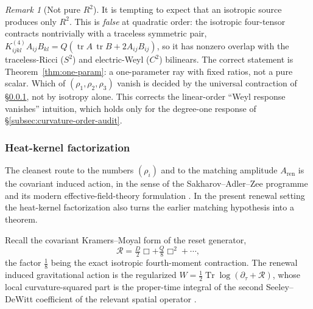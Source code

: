 \documentclass[11pt]{article}
\theoremstyle{definition}
\theoremstyle{remark}
\newtheorem{remark}[theorem]{Remark}
\newcommand{\Tr}{\operatorname{Tr}}
\newcommand{\tr}{\operatorname{tr}}
\newcommand{\ren}{\mathrm{ren}}
\newcommand{\Aren}{A_{\ren}}
\newcommand{\Weyl}{C}
\newcommand{\St}{S}
\begin{document}
\begin{remark}[Not pure $R^2$]
\label{rem:not-pure-r2}
It is tempting to expect that an isotropic source produces only $R^2$.  This is
\emph{false} at quadratic order: the isotropic four-tensor contracts nontrivially
with a traceless symmetric pair, $K^{(4)}_{ijkl}A_{ij}B_{kl}
=Q(\tr A\,\tr B+2A_{ij}B_{ij})$, so it has nonzero overlap with the
traceless-Ricci ($\St^2$) and electric-Weyl ($\Weyl^2$) bilinears.  The correct
statement is Theorem~\ref{thm:one-param}: a one-parameter ray with fixed ratios,
not a pure scalar.  Which of $(\rho_1,\rho_2,\rho_3)$ vanish is decided by the
universal contraction of \S\ref{sec:induced}, not by isotropy alone.  This
corrects the linear-order ``Weyl response vanishes'' intuition, which holds only
for the degree-one response of \S\ref{subsec:curvature-order-audit}.
\end{remark}

\subsubsection{Heat-kernel factorization}
\label{sec:induced}

The cleanest route to the numbers $(\rho_i)$ and to the matching amplitude
$\Aren$ is the covariant induced action, in the sense of the
Sakharov--Adler--Zee programme and its modern effective-field-theory formulation
\cite{Sakharov1968,Adler1982,Zee1981,VisserInducedGravity}.  In the present
renewal setting the heat-kernel factorization also turns the earlier matching
hypothesis into a theorem.

Recall the covariant Kramers--Moyal form of the reset generator,
\begin{equation}
\label{eq:KM}
 \mathcal R=\tfrac D2\Box+\tfrac Q8\Box^2+\cdots,
\end{equation}
the factor $\tfrac18$ being the exact isotropic fourth-moment contraction.  The
renewal induced gravitational action is the regularized
$W=\tfrac12\Tr\log(\partial_\tau+\mathcal R)$, whose local curvature-squared part
is the proper-time integral of the second Seeley--DeWitt coefficient of the
relevant spatial operator \cite{GilkeyHeat,AvramidiHeat,Vassilevich,
BarvinskyVilkovisky}.
\end{document}
